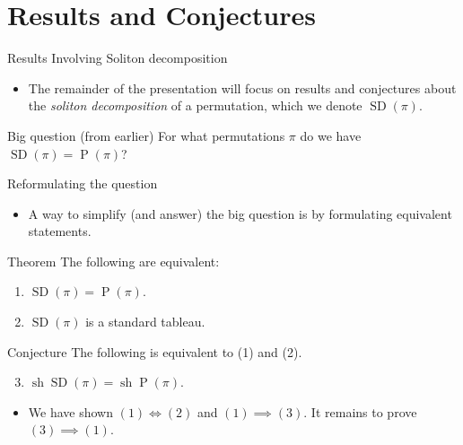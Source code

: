 \documentclass[aspectratio=169, serif]{beamer}
\DeclareMathOperator{\SD}{SD}
\DeclareMathOperator{\Pt}{P}
\DeclareMathOperator{\sh}{sh}
\begin{document}
\section{Results and Conjectures}
\begin{frame}{Results Involving Soliton decomposition}
    \begin{itemize}
        \item The remainder of the presentation will focus on results and conjectures about the \emph{soliton decomposition} of a permutation, which we denote $\SD(\pi).$
    \end{itemize}
    \begin{block}{Big question (from earlier)}
        For what permutations $\pi$ do we have $\SD(\pi)=\Pt(\pi)$?
    \end{block}
\end{frame}
\begin{frame}{Reformulating the question}
    \begin{itemize}
        \item A way to simplify (and answer) the big question is by formulating equivalent statements.
    \end{itemize}
    
     \begin{alertblock}{Theorem}
        The following are equivalent: \begin{enumerate}
            \item $\SD(\pi) = \Pt(\pi).$
            \item $\SD(\pi)$ is a standard tableau.
        \end{enumerate}
    \end{alertblock}
    \begin{block}{Conjecture}
        The following is equivalent to (1) and (2).
        \begin{enumerate}
            \setcounter{enumi}{2}
            \item $\sh\SD(\pi) = \sh\Pt(\pi).$ 
        \end{enumerate}
    \end{block}
    \begin{itemize}
        \item We have shown $(1)\Longleftrightarrow(2)$ and $(1) \implies (3).$ It remains to prove $(3)\implies(1).$
    \end{itemize}
\end{frame}
\end{document}
